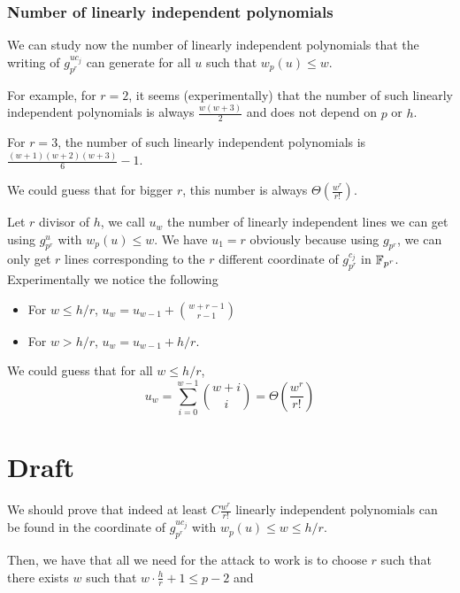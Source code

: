 \documentclass[12pt,a4paper,titlepage]{article}
\begin{document}
\subsubsection{Number of linearly independent polynomials}

We can study now the number of linearly independent polynomials that the writing of $g_{p^r}^{uc_j}$ can generate for all $u$ such that $w_p(u) \leq w$.

For example, for $r = 2$, it seems (experimentally) that the number of such linearly independent polynomials is always $\frac{w(w+3)}{2}$ and does not depend on $p$ or $h$.

For $r = 3$, the number of such linearly independent polynomials is $\frac{(w+1)(w+2)(w+3)}{6}-1$.

We could guess that for bigger $r$, this number is always $\Theta\left(\frac{w^r}{r!}\right)$.

Let $r$ divisor of $h$, we call $u_w$ the number of linearly independent lines we can get using $g_{p^r}^u$ with $w_p(u) \leq w$. We have $u_1 = r$ obviously because using $g_{p^r}$, we can only get $r$ lines corresponding to the $r$ different coordinate of $g_{p^r}^{c_j}$ in $\mathbb{F}_{p^r}$.
Experimentally we notice the following
\begin{itemize}
\item For $w \leq h/r$, $u_w = u_{w-1} + \binom{w+r-1}{r-1}$
\item For $w > h/r$, $u_w = u_{w-1} + h/r$.
\end{itemize}

We could guess that for all $w \leq h/r$,
$$ u_w = \sum_{i=0}^{w-1} \binom{w+i}{i} = \Theta\left( \frac{w^r}{r!}\right) $$



\section{Draft}

We should prove that indeed at least $C\frac{w^r}{r!}$ linearly independent polynomials can be found in the coordinate of $g_{p^r}^{uc_j}$ with $w_p(u) \leq w \leq h/r$.

Then, we have that all we need for the attack to work is to choose $r$ such that there exists $w$ such that $w \cdot \frac{h}{r} + 1 \leq p-2$ and
\end{document}
